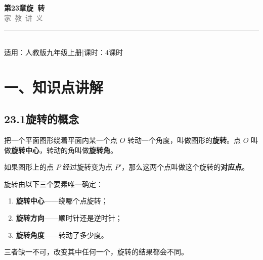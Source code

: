 \documentclass[12pt, a4paper]{ctexart}
\begin{document}
\begin{center}
{\Huge\bfseries\textcolor{mainblue}{第23章\quad 旋\ 转}}\\[12pt]
{\Large\textcolor{gray}{家\ 教\ 讲\ 义}}\\[8pt]
\rule{0.6\textwidth}{1pt}\\[8pt]
{\normalsize 适用：人教版\quad 九年级上册\quad |\quad 课时：4课时}
\end{center}
\vspace{10pt}

\section*{\textcolor{mainblue}{一、知识点讲解}}

\subsection*{23.1\quad 旋转的概念}

\begin{knowledgebox}[旋转的定义]
把一个平面图形绕着平面内某一个点 $O$ 转动一个角度，叫做图形的\textbf{旋转}。点 $O$ 叫做\textbf{旋转中心}，转动的角叫做\textbf{旋转角}。

如果图形上的点 $P$ 经过旋转变为点 $P'$，那么这两个点叫做这个旋转的\textbf{对应点}。
\end{knowledgebox}

\begin{knowledgebox}[旋转的三要素]
旋转由以下三个要素唯一确定：
\begin{enumerate}[nosep]
  \item \textbf{旋转中心}——绕哪个点旋转；
  \item \textbf{旋转方向}——顺时针还是逆时针；
  \item \textbf{旋转角度}——转动了多少度。
\end{enumerate}
三者缺一不可，改变其中任何一个，旋转的结果都会不同。
\end{knowledgebox}
\end{document}
